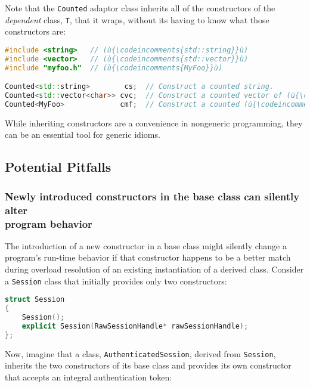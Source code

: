 \noindent Note that the \texttt{Counted} adaptor class inherits all of the
constructors of the \emph{dependent} class, \texttt{T}, that it wraps,
without its having to know what those constructors are:

\begin{lstlisting}[language=C++]
#include <string>   // (ù{\codeincomments{std::string}}ù)
#include <vector>   // (ù{\codeincomments{std::vector}}ù)
#include "myfoo.h"  // (ù{\codeincomments{MyFoo}}ù)

Counted<std::string>        cs;  // Construct a counted string.
Counted<std::vector<char>> cvc;  // Construct a counted vector of (ù{\codeincomments{char}}ù).
Counted<MyFoo>             cmf;  // Construct a counted (ù{\codeincomments{MyFoo}}ù) object.
\end{lstlisting}

\noindent While inheriting constructors are a convenience in nongeneric
programming, they can be an essential tool for generic idioms.

\subsection[Potential Pitfalls]{Potential Pitfalls}\label{potential-pitfalls-ctorinheriting}

\subsubsection[Newly introduced constructors in the base class can silently alter program behavior]{Newly introduced constructors in the base class can silently alter\\[0.5ex] program behavior}\label{newly-introduced-constructors-in-the-base-class-can-silently-alter-program-behavior}

The introduction of a new constructor in a base class might silently
change a program's run-time behavior if that constructor happens to be a
better match during overload resolution of an existing instantiation of
a derived class. Consider a \texttt{Session} class that initially provides only two constructors:

\begin{lstlisting}[language=C++]
struct Session
{
    Session();
    explicit Session(RawSessionHandle* rawSessionHandle);
};
\end{lstlisting}

\noindent Now, imagine that a class, \texttt{AuthenticatedSession}, derived from
\texttt{Session}, inherits the two constructors of its base class and provides its own constructor that accepts an integral
authentication token:

